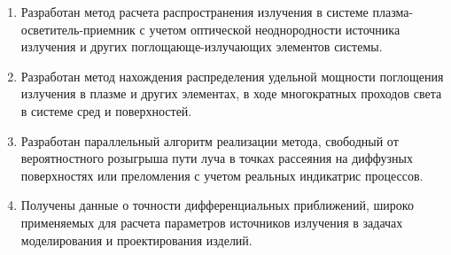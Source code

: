 


\begin{enumerate}
	\item Разработан метод расчета распространения излучения в системе плазма-осветитель-приемник с учетом оптической неоднородности источника излучения и других поглощающе-излучающих элементов системы.

	\item Разработан метод нахождения распределения удельной мощности поглощения излучения в плазме и других элементах, в ходе многократных проходов света в системе сред и поверхностей.

	\item Разработан параллельный алгоритм реализации метода, свободный от вероятностного розыгрыша пути луча в точках рассеяния на диффузных поверхностях или преломления с учетом реальных индикатрис процессов.

	\item Получены данные о точности дифференциальных приближений, широко применяемых для расчета параметров источников излучения в задачах моделирования и проектирования изделий.
\end{enumerate}
